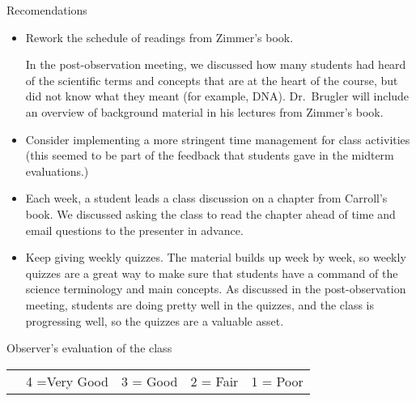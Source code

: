 \documentclass[11pt,dvipsnames]{article}
\begin{document}

\vskip 1cm
{\large Recomendations}

\begin{itemize}
	\item Rework the schedule of readings from Zimmer's book. 
	\begin{adjustwidth}{1cm}{1cm}
	In the post-observation meeting, we discussed how many students had heard of the scientific terms and concepts that are at the heart of the course, but did not know what they meant (for example, DNA). Dr.~Brugler will include an overview of background material in his lectures from Zimmer's book.
	\end{adjustwidth}
	\item Consider implementing a more stringent time management for class activities (this seemed to be part of the feedback that students gave in the midterm evaluations.) 
	\item Each week, a student leads a class discussion on a chapter from Carroll's book. We discussed asking the class to read the chapter ahead of time and email questions to the presenter in advance. 
	\item Keep giving weekly quizzes. The material builds up week by week, so weekly quizzes are a great way to make sure that students have a command of the science terminology and main concepts. As discussed in the post-observation meeting, students are doing pretty well in the quizzes, and the class is progressing well, so the quizzes are a valuable asset.
	
	
	
\end{itemize}
\vskip 1cm
{\large Observer's evaluation of the class}


{\tabulinesep=1.2mm
	\begin{tabu}{c  c c c c  }
		
		{}   & 4 =Very Good & 3 = Good & 2 = Fair & 1 = Poor   \\ 	
	\end{tabu}}
\end{document}
